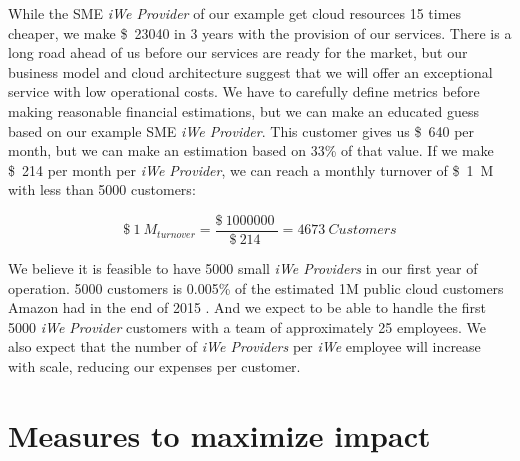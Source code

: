 
While the SME \textit{iWe Provider} of our example get cloud resources 15
times cheaper, we make \SI{23040}[\$]{} in 3 years with the provision of our
services.  There is a long road ahead of us before our services are ready for
the market, but our business model and cloud architecture suggest that we will
offer an exceptional service with low operational costs. We have to carefully
define metrics before making reasonable financial estimations, but we can make
an educated guess based on our example SME \textit{iWe Provider}.  This
customer gives us \SI{640}[\$]{} per month, but we can make an estimation based
on 33\% of that value. If we make \SI{214}[\$]{} per month per \textit{iWe
Provider}, we can reach a monthly turnover of \SI{1}[\$]{M} with less than 5000
customers:

\begin{equation}
    \SI{1}[\$]{M}_{turnover} = \frac{\SI{1000000}[\$]{}}{\SI{214}[\$]{}} = 4673~Customers
\end{equation}

We believe it is feasible to have 5000 small \textit{iWe Providers} in our
first year of operation. 5000 customers is 0.005\% of the estimated 1M public
cloud customers Amazon had in the end of 2015 \cite{howlongaws}. And we expect
to be able to handle the first 5000 \textit{iWe Provider} customers with a
team of approximately 25 employees. We also expect that the number of
\textit{iWe Providers} per \textit{iWe} employee will increase with scale,
reducing our expenses per customer.

\section{Measures to maximize impact} 
\label{sec:maximize-impact}



